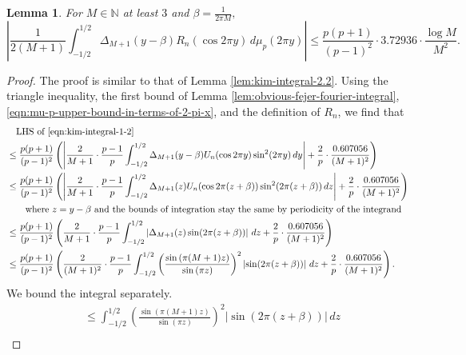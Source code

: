 \documentclass[11pt,letterpaper,reqno]{amsart}
\newtheorem{lemma}[theorem]{Lemma}
\theoremstyle{definition}
\numberwithin{equation}{section}
\numberwithin{figure}{section}
\numberwithin{table}{section}
\begin{document}
\begin{lemma}\label{lem:kim-integral-1-2}
    For $M \in \mathbb{N}$ at least $3$ and $\beta = \frac{1}{2\pi M},$
    \begin{equation}
        \left| \frac{1}{2(M + 1)} \int_{-1/2}^{1/2}
        \Delta_{M+1}(y - \beta) R_n ( \cos 2 \pi y ) \,d\mu_p(2\pi y) \right| \leq \frac{p(p + 1)}{(p - 1)^2} \cdot 3.72936 \cdot \frac{\log M}{M^2} . \label{eqn:kim-integral-1-2}
    \end{equation}
\end{lemma}

\begin{proof}
    The proof is similar to that of Lemma \ref{lem:kim-integral-2.2}. Using the triangle inequality, the first bound of Lemma \ref{lem:obvious-fejer-fourier-integral}, \eqref{eqn:mu-p-upper-bound-in-terms-of-2-pi-x}, and the definition of $R_n$, we find that 
    \begin{align}
        &\quad \text{LHS of \eqref{eqn:kim-integral-1-2}}\\ &\leq \frac{p(p + 1)}{(p - 1)^2}\left( \left| \frac{2}{M + 1} \cdot \frac{p - 1}{p} \int_{-1/2}^{1/2}
 \Delta_{M+1}(y - \beta) U_n ( \cos 2 \pi y ) \sin^2(2\pi y)\, dy \right| + \frac{2}{p} \cdot \frac{0.607056}{(M + 1)^2} \right)\\
 &\leq \frac{p(p + 1)}{(p - 1)^2}\left( \left| \frac{2}{M + 1} \cdot \frac{p - 1}{p} \int_{-1/2}^{1/2}
 \Delta_{M+1}(z) U_n ( \cos 2 \pi (z + \beta )) \sin^2(2\pi (z + \beta))\, dz \right| + \frac{2}{p} \cdot \frac{0.607056}{(M + 1)^2} \right)\\
 &\qquad \text{where $z = y - \beta$ and the bounds of integration stay the same by periodicity of the integrand}\\
 &\leq \frac{p(p + 1)}{(p - 1)^2}\left( \frac{2}{M + 1} \cdot \frac{p - 1}{p} \int_{-1/2}^{1/2} \left|
 \Delta_{M+1}(z) \sin(2\pi (z + \beta)) \right| \, dz + \frac{2}{p} \cdot \frac{0.607056}{(M + 1)^2} \right)\\
 &\leq \frac{p(p + 1)}{(p - 1)^2}\left( \frac{2}{(M + 1)^2} \cdot \frac{p - 1}{p} \int_{-1/2}^{1/2}
 \left( \frac{\sin \left( \pi (M + 1) z \right)}{\sin \left( \pi z \right)} \right)^2 \left| \sin(2\pi (z + \beta)) \right| \, dz + \frac{2}{p} \cdot \frac{0.607056}{(M + 1)^2} \right).
    \end{align}
We bound the integral separately.
\begin{align}
    &\leq \int_{-1/2}^{1/2} \left( \frac{\sin \left( \pi (M + 1) z \right)}{\sin \left( \pi z \right)} \right)^2  |\sin\left( 2\pi (z + \beta) \right) | \, dz\\

\end{align}
\end{proof}
\end{document}
